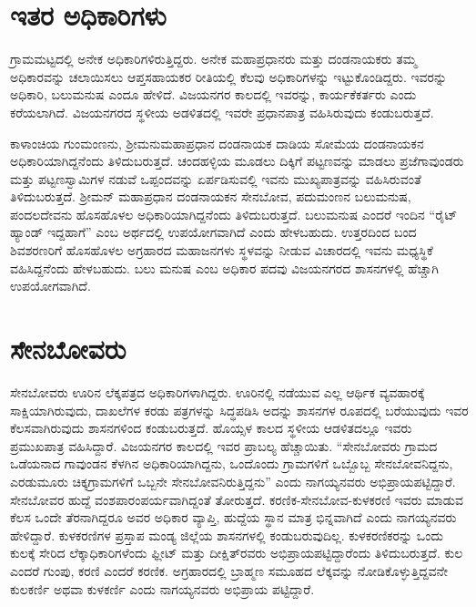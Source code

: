 \vskip 4pt

\section{ಇತರ ಅಧಿಕಾರಿಗಳು}

ಗ್ರಾಮಮಟ್ಟದಲ್ಲಿ ಅನೇಕ ಅಧಿಕಾರಿಗಳಿರುತ್ತಿದ್ದರು. ಅನೇಕ ಮಹಾಪ್ರಧಾನರು ಮತ್ತು ದಂಡನಾಯಕರು ತಮ್ಮ ಅಧಿಕಾರವನ್ನು ಚಲಾಯಿಸಲು ಆಪ್ತಸಹಾಯಕರ ರೀತಿಯಲ್ಲಿ ಕೆಲವು ಅಧಿಕಾರಿಗಳನ್ನು ಇಟ್ಟುಕೊಂಡಿದ್ದರು. ಇವರನ್ನು ಅಧಿಕಾರಿ, ಬಲುಮನುಷ ಎಂದೂ ಹೇಳಿದೆ. ವಿಜಯನಗರ ಕಾಲದಲ್ಲಿ ಇವರನ್ನು, ಕಾರ್ಯಕೆಕರ್ತರು ಎಂದು ಕರೆಯಲಾಗಿದೆ. ವಿಜಯನಗರದ ಸ್ಥಳೀಯ ಅಡಳಿತದಲ್ಲಿ ಇವರೇ ಪ್ರಧಾನಪಾತ್ರ ವಹಿಸಿರುವುದು ಕಂಡುಬರುತ್ತದೆ.

\vskip 2pt

ಕಾಳಾಂಚಿಯ ಗುಂಮಂಣನು, ಶ‍್ರೀಮನುಮಹಾಪ್ರಧಾನ ದಂಡನಾಯಕ ದಾಡಿಯ ಸೋಮೆಯ ದಂಡನಾಯಕನ ಅಧಿಕಾರಿಯಾಗಿದ್ದನೆಂದು ತಿಳಿದುಬರುತ್ತದೆ. ಚಂದಹಳ್ಳಿಯ ಮೂಡಲು ದಿಕ್ಕಿಗೆ ಪಟ್ಟಣವನ್ನು ಮಾಡಲು ಪ್ರಜೆಗಾವುಂಡರು ಮತ್ತು ಪಟ್ಟಣಸ್ವಾಮಿಗಳ ನಡುವೆ ಒಪ್ಪಂದವನ್ನು ಏರ್ಪಡಿಸುವಲ್ಲಿ ಇವನು ಮುಖ್ಯಪಾತ್ರವನ್ನು ವಹಿಸಿರುವಂತೆ ತಿಳಿದುಬರುತ್ತದೆ. ಶ‍್ರೀಮನ್​ ಮಹಾಪ್ರಧಾನ ದಂಡನಾಯಕನ ಸೇನಬೋವ, ಪದುಮಂಣನ ಬಲುಮನುಷ, ಪಂದಲದೇವನು ಹೊಸಹೊಳಲ ಅಧಿಕಾರಿಯಾಗಿದ್ದನೆಂದು ತಿಳಿದುಬರುತ್ತದೆ. ಬಲುಮನುಷ ಎಂದರೆ ಇಂದಿನ “ರೈಟ್​ ಹ್ಯಾಂಡ್​ ಇದ್ದಹಾಗೆ” ಎಂಬ ಅರ್ಥದಲ್ಲಿ ಉಪಯೋಗವಾಗಿದೆ ಎಂದು ಹೇಳಬಹುದು. ಉತ್ತರದಿಂದ ಬಂದ ಶಿವಶರಣರಿಗೆ ಹೊಸಹೊಳಲ ಅಗ್ರಹಾರದ ಮಹಾಜನಗಳು ಸ್ಥಳವನ್ನು ನೀಡುವ ವಿಚಾರದಲ್ಲಿ ಇವನು ಮಧ್ಯಸ್ಥಿಕೆ ವಹಿಸಿದ್ದನೆಂದು ಹೇಳಬಹುದು. ಬಲು ಮನುಷ ಎಂಬ ಅಧಿಕಾರ ಪದವು ವಿಜಯನಗರದ ಶಾಸನಗಳಲ್ಲಿ ಹೆಚ್ಚಾಗಿ ಉಪಯೋಗವಾಗಿದೆ.

\vskip 2pt

\section{ಸೇನಬೋವರು}

ಸೇನಬೋವರು ಊರಿನ ಲೆಕ್ಕಪತ್ರದ ಅಧಿಕಾರಿಗಳಾಗಿದ್ದರು. ಊರಿನಲ್ಲಿ ನಡೆಯುವ ಎಲ್ಲ ಆರ್ಥಿಕ ವ್ಯವಹಾರಕ್ಕೆ ಸಾಕ್ಷಿಯಾಗಿರುವುದು, ದಾಖಲೆಗಳ ಕರಡು ಪತ್ರಗಳನ್ನು ಸಿದ್ಧಪಡಿಸಿ ಅದನ್ನು ಶಾಸನಗಳ ರೂಪದಲ್ಲಿ ಬರೆಯುವುದು ಇವರ ಕೆಲಸವಾಗಿರುವುದು ಶಾಸನಗಳಿಂದ ಕಂಡುಬರುತ್ತದೆ. ಹೊಯ್ಸಳ ಕಾಲದ ಸ್ಥಳೀಯ ಆಡಳಿತದಲ್ಲೂ ಇವರು ಪ್ರಮುಖಪಾತ್ರ ವಹಿಸಿದ್ದಾರೆ. ವಿಜಯನಗರ ಕಾಲದಲ್ಲಿ ಇವರ ಪ್ರಾಬಲ್ಯ ಹೆಚ್ಚಾಯಿತು. “ಸೇನಬೋವರು ಗ್ರಾಮದ ಒಡೆಯನಾದ ಗಾವುಂಡನ ಕೆಳಗಿನ ಅಧಿಕಾರಿಯಾಗಿದ್ದನು, ಒಂದೊಂದು ಗ್ರಾಮಗಳಿಗೆ ಒಬ್ಬೊಬ್ಬ ಸೇನಬೋವನಿದ್ದನು, ಎರಡುಮೂರು ಚಿಕ್ಕಗ್ರಾಮಗಳಿಗೆ ಒಬ್ಬನೇ ಸೇನಬೋವನಿರುತ್ತಿದ್ದನು” ಎಂದು ನಾಗಯ್ಯನವರು ಅಭಿಪ್ರಾಯಪಟ್ಟಿದ್ದಾರೆ. ಸೇನಬೋವರ ಹುದ್ದೆ ವಂಶಪಾರಂಪರ್ಯವಾಗಿದ್ದಂತೆ ತೋರುತ್ತದೆ. ಕರಣಿಕ-ಸೇನಬೋವ-ಕುಳಕರಣಿ ಇವರು ಮಾಡುವ ಕೆಲಸ ಒಂದೇ ತೆರನಾಗಿದ್ದರೂ ಅವರ ಅಧಿಕಾರ ವ್ಯಾಪ್ತಿ, ಹುದ್ದೆಯ ಸ್ಥಾನ ಮಾತ್ರ ಭಿನ್ನವಾಗಿದೆ ಎಂದು ನಾಗಯ್ಯನವರು ಹೇಳಿದ್ದಾರೆ. ಕುಳಕರಣಿಗಳ ಪ್ರಸ್ತಾಪ ಮಂಡ್ಯ ಜಿಲ್ಲೆಯ ಶಾಸನಗಳಲ್ಲಿ ಕಂಡುಬರುವುದಿಲ್ಲ. ಕುಳಕರಣಿಕರನ್ನು ಒಂದು ಕುಲಕ್ಕೆ ಸೇರಿದ ಲೆಕ್ಕಾಧಿಕಾರಿಗಳೆಂದು ಫ್ಲೀಟ್​ ಮತ್ತು ದೀಕ್ಷಿತ್​ರವರು ಅಭಿಪ್ರಾಯಪಟ್ಟಿದ್ದಾರೆಂದು ತಿಳಿದುಬರುತ್ತದೆ. ಕುಲ ಎಂದರೆ ಗುಂಪು, ಕರಣಿ ಎಂದರೆ ಕರಣಿಕ. ಅಗ್ರಹಾರದಲ್ಲಿ ಬ್ರಾಹ್ಮಣ ಸಮೂಹದ ಲೆಕ್ಕವನ್ನು ನೋಡಿಕೊಳ್ಳುತ್ತಿದ್ದವನೇ ಕುಲಕರ್ಣಿ ಅಥವಾ ಕುಳಕರ್ಣಿ ಎಂದು ನಾಗಯ್ಯನವರು ಅಭಿಪ್ರಾಯ ಪಟ್ಟಿದ್ದಾರೆ.

